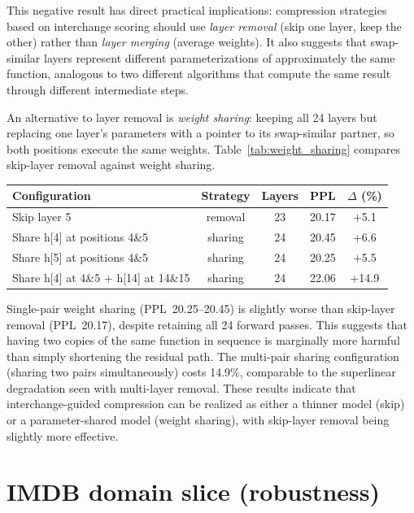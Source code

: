 \documentclass{article}
\newenvironment{tabhere}{%
  \par\medskip
  \begin{center}
}{%
  \end{center}
  \medskip
}
\begin{document}
This negative result has direct practical implications: compression strategies based on interchange scoring should use \emph{layer removal} (skip one layer, keep the other) rather than \emph{layer merging} (average weights). It also suggests that swap-similar layers represent different parameterizations of approximately the same function, analogous to two different algorithms that compute the same result through different intermediate steps.

An alternative to layer removal is \emph{weight sharing}: keeping all 24 layers but replacing one layer's parameters with a pointer to its swap-similar partner, so both positions execute the same weights. Table~\ref{tab:weight_sharing} compares skip-layer removal against weight sharing.

\begin{tabhere}
\begin{tabular}{lcccc}
\toprule
Configuration & Strategy & Layers & PPL & $\Delta$ (\%) \\
\midrule
Skip layer 5 & removal & 23 & 20.17 & +5.1 \\
Share h[4] at positions 4\&5 & sharing & 24 & 20.45 & +6.6 \\
Share h[5] at positions 4\&5 & sharing & 24 & 20.25 & +5.5 \\
Share h[4] at 4\&5 + h[14] at 14\&15 & sharing & 24 & 22.06 & +14.9 \\
\bottomrule
\end{tabular}
\label{tab:weight_sharing}
\end{tabhere}


Single-pair weight sharing (PPL~20.25--20.45) is slightly worse than skip-layer removal (PPL~20.17), despite retaining all 24 forward passes. This suggests that having two copies of the same function in sequence is marginally more harmful than simply shortening the residual path. The multi-pair sharing configuration (sharing two pairs simultaneously) costs 14.9\%, comparable to the superlinear degradation seen with multi-layer removal. These results indicate that interchange-guided compression can be realized as either a thinner model (skip) or a parameter-shared model (weight sharing), with skip-layer removal being slightly more effective.

\section{IMDB domain slice (robustness)}
\label{sec:app_imdb_robustness}
\end{document}
